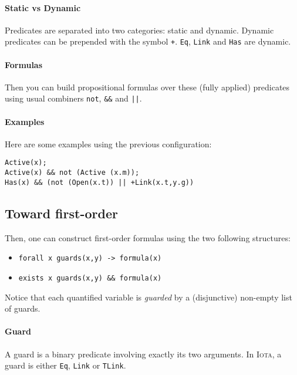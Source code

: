 \documentclass[10pt,a4paper]{article}
\newcommand\Iota{\textsc{Iota}}
\newcommand{\ocaml}{\texttt}
\begin{document}
\paragraph{Static vs Dynamic}
Predicates are separated into two categories: static and dynamic. Dynamic predicates can be prepended with the symbol \ocaml{+}. \ocaml{Eq}, \ocaml{Link} and \ocaml{Has} are dynamic.

\paragraph{Formulas}
Then you can build propositional formulas over these (fully applied) predicates using usual combiners \ocaml{not}, \ocaml{&&} and \ocaml{||}.

\paragraph{Examples}
Here are some examples using the previous configuration:
\begin{verbatim}
Active(x);
Active(x) && not (Active (x.m));
Has(x) && (not (Open(x.t)) || +Link(x.t,y.g))
\end{verbatim}

\subsection{Toward first-order}
Then, one can construct first-order formulas using the two following structures:
\begin{itemize}
\item \ocaml{forall x guards(x,y) -> formula(x)}
\item \ocaml{exists x guards(x,y) && formula(x)}
\end{itemize}
Notice that each quantified variable is \emph{guarded} by a (disjunctive) non-empty list of guards.

\paragraph{Guard}
A guard is a binary predicate involving exactly its two arguments. In \Iota{}, a guard is either \ocaml{Eq}, \ocaml{Link} or \ocaml{TLink}.
\end{document}
